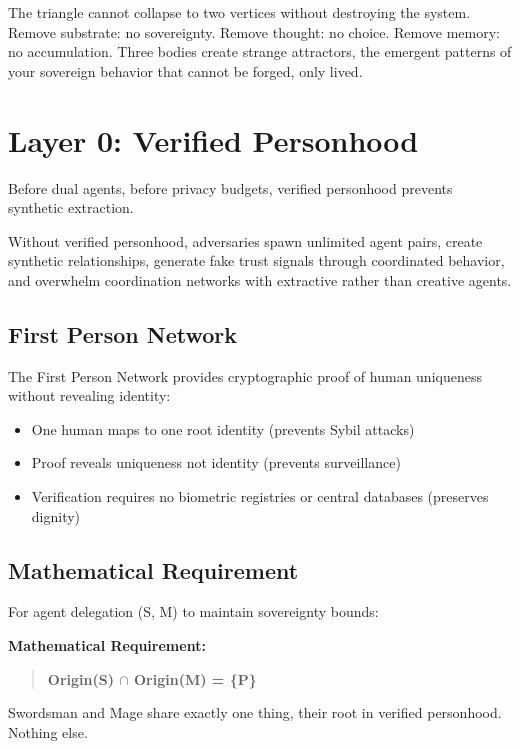\documentclass[11pt,a4paper]{article}
\theoremstyle{definition}
\begin{document}
The triangle cannot collapse to two vertices without destroying the system. Remove substrate: no sovereignty. Remove thought: no choice. Remove memory: no accumulation. Three bodies create strange attractors, the emergent patterns of your sovereign behavior that cannot be forged, only lived.

\section{Layer 0: Verified Personhood}

Before dual agents, before privacy budgets, verified personhood prevents synthetic extraction.

Without verified personhood, adversaries spawn unlimited agent pairs, create synthetic relationships, generate fake trust signals through coordinated behavior, and overwhelm coordination networks with extractive rather than creative agents.

\subsection{First Person Network}

The First Person Network provides cryptographic proof of human uniqueness without revealing identity:

\begin{itemize}
    \item One human maps to one root identity (prevents Sybil attacks)
    \item Proof reveals uniqueness not identity (prevents surveillance)
    \item Verification requires no biometric registries or central databases (preserves dignity)
\end{itemize}

\subsection{Mathematical Requirement}

For agent delegation (S, M) to maintain sovereignty bounds:

\textbf{Mathematical Requirement:}

\begin{quote}
\textbf{Origin(S) $\cap$ Origin(M) = \{P\}}
\end{quote}

Swordsman and Mage share exactly one thing, their root in verified personhood. Nothing else.
\end{document}
